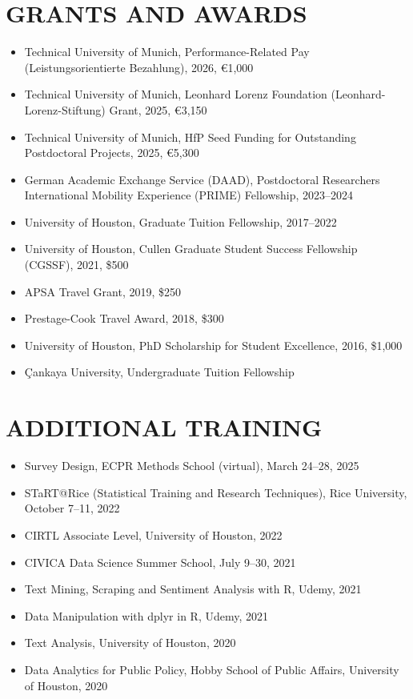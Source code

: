 \documentclass[11pt,a4paper,roman]{moderncv}
\begin{document}
	\section{GRANTS AND AWARDS}
	
	\begin{itemize}
		\item Technical University of Munich, Performance-Related Pay (Leistungsorientierte Bezahlung), 2026, \euro 1,000
		\item Technical University of Munich, Leonhard Lorenz Foundation (Leonhard-Lorenz-Stiftung) Grant, 2025, \euro 3,150
		\item Technical University of Munich, HfP Seed Funding for Outstanding Postdoctoral Projects, 2025, \euro 5,300
		\item German Academic Exchange Service (DAAD), Postdoctoral Researchers International Mobility Experience (PRIME) Fellowship, 2023--2024
		\item University of Houston, Graduate Tuition Fellowship, 2017--2022
		\item University of Houston, Cullen Graduate Student Success Fellowship (CGSSF), 2021, \$500
		\item APSA Travel Grant, 2019, \$250
		\item Prestage-Cook Travel Award, 2018, \$300
		\item University of Houston, PhD Scholarship for Student Excellence, 2016, \$1,000
		\item \c{C}ankaya University, Undergraduate Tuition Fellowship
	\end{itemize}
	
	\section{ADDITIONAL TRAINING}
	
	\begin{itemize}
		\item Survey Design, ECPR Methods School (virtual), March 24--28, 2025
		\item STaRT@Rice (Statistical Training and Research Techniques), Rice University, October 7--11, 2022
		\item CIRTL Associate Level, University of Houston, 2022
		\item CIVICA Data Science Summer School, July 9--30, 2021
		\item Text Mining, Scraping and Sentiment Analysis with R, Udemy, 2021
		\item Data Manipulation with dplyr in R, Udemy, 2021
		\item Text Analysis, University of Houston, 2020
		\item Data Analytics for Public Policy, Hobby School of Public Affairs, University of Houston, 2020
	\end{itemize}
	
\end{document}
